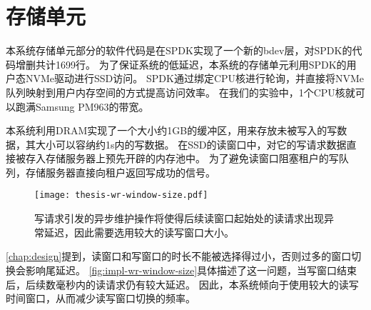 \section{存储单元}
\label{sec:impl-storage-unit}

本系统存储单元部分的软件代码是在SPDK实现了一个新的bdev层，对SPDK的代码增删共计1699行。
为了保证系统的低延迟，本系统的存储单元利用SPDK的用户态NVMe驱动进行SSD访问。
SPDK通过绑定CPU核进行轮询，并直接将NVMe队列映射到用户内存空间的方式提高访问效率。
在我们的实验中，1个CPU核就可以跑满Samsung PM963的带宽。

本系统利用DRAM实现了一个大小约1GB的缓冲区，用来存放未被写入的写数据，其大小可以容纳约1s内的写数据。
在SSD的读窗口中，对它的写请求数据直接被存入存储服务器上预先开辟的内存池中。
为了避免读窗口阻塞租户的写队列，存储服务器直接向租户返回写成功的信号。

\begin{figure}[h]
  \centering
  \texttt{[image: thesis-wr-window-size.pdf]}
  \caption{
        写请求引发的异步维护操作将使得后续读窗口起始处的读请求出现异常延迟，因此需要选用较大的读写窗口大小。
      }
  \label{fig:impl-wr-window-size}
\end{figure}

\autoref{chap:design}提到，读窗口和写窗口的时长不能被选择得过小，否则过多的窗口切换会影响尾延迟。
\autoref{fig:impl-wr-window-size}具体描述了这一问题，当写窗口结束后，后续数毫秒内的读请求仍有较大延迟。
因此，本系统倾向于使用较大的读写时间窗口，从而减少读写窗口切换的频率。
